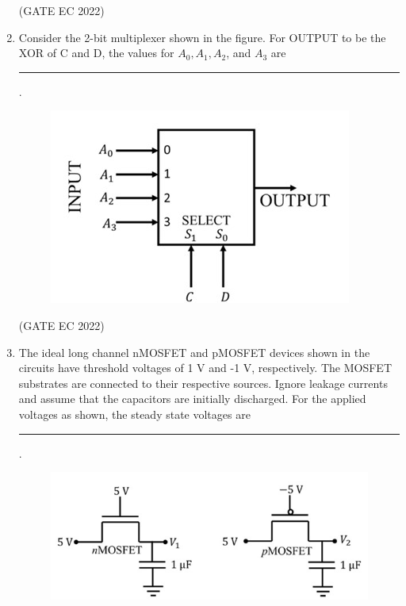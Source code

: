 \documentclass[journal,12pt,onecolumn]{IEEEtran}
\theoremstyle{remark}
\begin{document}
\begin{enumerate}
    \hfill{(GATE EC 2022)}
    \begin{enumerate}
    \end{enumerate}

    \item Consider the 2-bit multiplexer  shown in the figure. For OUTPUT to be the XOR of C and D, the values for $A_0, A_1, A_2$, and $A_3$ are \rule{2cm}{0.4pt}.
    \begin{figure}[H]
        \centering
        \includegraphics[width=0.5\columnwidth]{figs/m8.jpg}
        \caption*{}
        \label{fig:m8}
    \end{figure}

    \hfill{(GATE EC 2022)}
    \begin{enumerate}
    \end{enumerate}

    \item The ideal long channel nMOSFET and pMOSFET devices shown in the circuits have threshold voltages of 1 V and -1 V, respectively. The MOSFET substrates are connected to their respective sources. Ignore leakage currents and assume that the capacitors are initially discharged. For the applied voltages as shown, the steady state voltages are \rule{2cm}{0.4pt}.
    \begin{figure}[H]
        \centering
        \includegraphics[width=0.5\columnwidth]{figs/m9.jpg}
        \caption*{}
        \label{fig:m9}
    \end{figure}


\end{enumerate}
\end{document}
